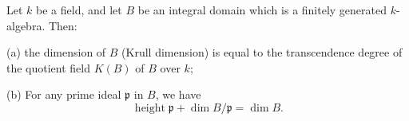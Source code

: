 Let $k$ be a field, and let $B$ be an integral domain which is a finitely generated $k$-algebra. Then:

(a) the dimension of $B$ (Krull dimension) is equal to the transcendence degree of the quotient field $K(B)$ of $B$ over $k$;

(b) For any prime ideal $\mathfrak{p}$ in $B$, we have
$$\operatorname{height} \mathfrak{p} + \dim B/\mathfrak{p} = \dim B.$$
